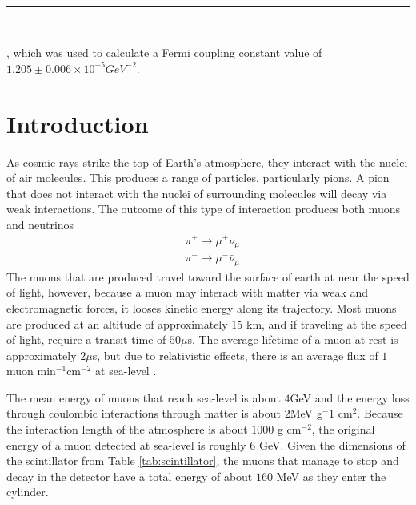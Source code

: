 \documentclass[12pt]{article}
\makeatletter
\newcommand{\partition}{\rule{\linewidth}{0.8pt}}
\renewcommand{\maketitle}{
\begin{center}
\@date \hfill  \@author\\
{\Large \textsc{\@title}}
\partition\\
\end{center}
}
\makeatother
\begin{document}
\maketitle
\linespread{1.5}
, which was used to calculate a Fermi coupling constant value of $1.205 \pm 0.006 \times 10^{-5}GeV^{-2}$.
\section{Introduction}
\noindent
As cosmic rays strike the top of Earth's atmosphere, they interact with the nuclei of air molecules. This produces a range of particles, particularly pions. A pion that does not interact with the nuclei of surrounding molecules will decay via weak interactions. The outcome of this type of interaction produces both muons and neutrinos
\begin{equation}
\begin{split}
  & \pi^+ \longrightarrow \mu^+ \nu_{\mu}
  \\
  & \pi^- \longrightarrow \mu^- \bar{\nu}_{\mu}
  \end{split}
  \end{equation}  
The muons that are produced travel toward the surface of earth at near the speed of light, however, because a muon may interact with matter via weak and electromagnetic forces, it looses kinetic energy along its trajectory.  Most muons are produced at an altitude of approximately $15$ km, and if traveling at the speed of light, require a transit time of $50\mu$s. The average lifetime of a muon at rest is approximately $2\mu$s, but due to relativistic effects, there is an average flux of $1$ muon min$^{-1}$cm$^{-2}$ at sea-level \cite{Beatty}. 

The mean energy of muons that reach sea-level is about $4$GeV and the energy loss through coulombic interactions through matter is about $2$MeV g$^-1$ cm$^{2}$. Because the interaction length of the atmosphere is about $1000$ g cm$^{-2}$, the original energy of a muon detected at sea-level is roughly $6$ GeV. Given the dimensions of the scintillator from Table \ref{tab:scintillator}, the muons that manage to stop and decay in the detector have a total energy of about $160$ MeV as they enter the cylinder. 
\end{document}
